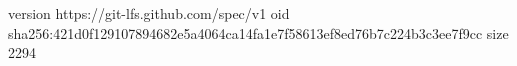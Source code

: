 version https://git-lfs.github.com/spec/v1
oid sha256:421d0f129107894682e5a4064ca14fa1e7f58613ef8ed76b7c224b3c3ee7f9cc
size 2294
